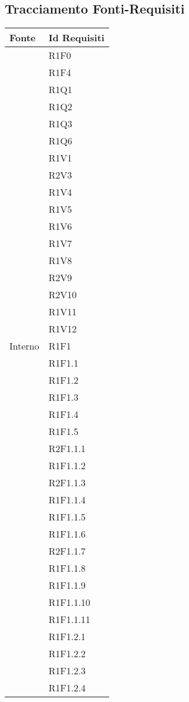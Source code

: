 \subsection{Tracciamento Fonti-Requisiti}
\normalsize
\begin{longtable}{|>{\centering}m{5cm}|m{5cm}<{\centering}|}
\hline 
\textbf{Fonte} & \textbf{Id Requisiti}\\
\hline
\endhead
{Capitolato}&{R1F0}\\
&{R1F4}\\
&{R1Q1}\\
&{R1Q2}\\
&{R1Q3}\\
&{R1Q6}\\
&{R1V1}\\
&{R2V3}\\
&{R1V4}\\
&{R1V5}\\
&{R1V6}\\
&{R1V7}\\
&{R1V8}\\
&{R2V9}\\
&{R2V10}\\
&{R1V11}\\
&{R1V12}\\ \hline
{Interno} & {R1F1}\\
&{R1F1.1}\\
&{R1F1.2}\\
&{R1F1.3}\\
&{R1F1.4}\\
&{R1F1.5}\\
&{R2F1.1.1}\\
&{R1F1.1.2}\\
&{R2F1.1.3}\\
&{R1F1.1.4}\\
&{R1F1.1.5}\\
&{R1F1.1.6}\\
&{R2F1.1.7}\\
&{R1F1.1.8}\\
&{R1F1.1.9}\\
&{R1F1.1.10}\\
&{R1F1.1.11}\\

&{R1F1.2.1}\\
&{R1F1.2.2}\\
&{R1F1.2.3}\\
&{R1F1.2.4}\\


\end{longtable}

